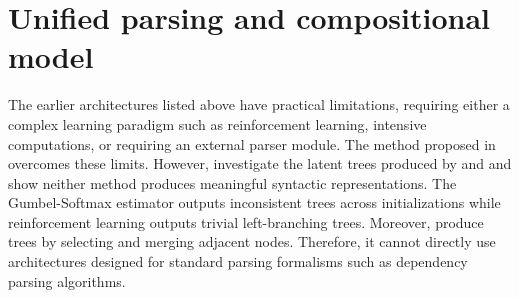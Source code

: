 
\section{Unified parsing and compositional model}

The earlier architectures listed above have practical limitations, requiring either a complex learning paradigm such as reinforcement learning, intensive computations, or requiring an external parser module. The method proposed in \textcite{choi_18} overcomes these limits. However, \textcite{williams_18} investigate the latent trees produced by \textcite{yogatama_17} and \textcite{choi_18} and show neither method produces meaningful syntactic representations. The Gumbel-Softmax estimator outputs inconsistent trees across initializations while reinforcement learning outputs trivial left-branching trees. Moreover, \textcite{choi_18} produce trees by selecting and merging adjacent nodes. Therefore, it cannot directly use architectures designed for standard parsing formalisms such as dependency parsing algorithms.

